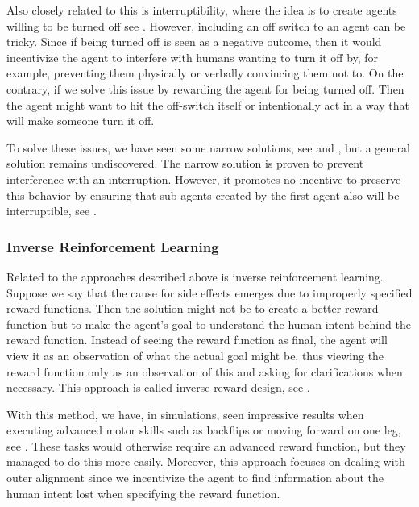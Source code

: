 \documentclass[12pt,A4]{report}
\theoremstyle{definition}
\begin{document}
Also closely related to this is interruptibility, where the idea is to create agents willing to be turned off see \citet{Interruptible}. However, including an off switch to an agent can be tricky. Since if being turned off is seen as a negative outcome, then it would incentivize the agent to interfere with humans wanting to turn it off by, for example, preventing them physically or verbally convincing them not to. On the contrary, if we solve this issue by rewarding the agent for being turned off. Then the agent might want to hit the off-switch itself or intentionally act in a way that will make someone turn it off. 

To solve these issues, we have seen some narrow solutions, see \citet{Hadfield-Menell} and \citet{Carey}, but a general solution remains undiscovered. The narrow solution is proven to prevent interference with an interruption. However, it promotes no incentive to preserve this behavior by ensuring that sub-agents created by the first agent also will be interruptible, see \citet{co-founding}.  

\subsubsection{Inverse Reinforcement Learning}
Related to the approaches described above is inverse reinforcement learning. Suppose we say that the cause for side effects emerges due to improperly specified reward functions. Then the solution might not be to create a better reward function but to make the agent's goal to understand the human intent behind the reward function. Instead of seeing the reward function as final, the agent will view it as an observation of what the actual goal might be, thus viewing the reward function only as an observation of this and asking for clarifications when necessary. This approach is called inverse reward design, see \citet{Hadfield-Menell2}.

With this method, we have, in simulations, seen impressive results when executing advanced motor skills such as backflips or moving forward on one leg, see \citet{Christiano}. These tasks would otherwise require an advanced reward function, but they managed to do this more easily. Moreover, this approach focuses on dealing with outer alignment since we incentivize the agent to find information about the human intent lost when specifying the reward function. 
\end{document}
